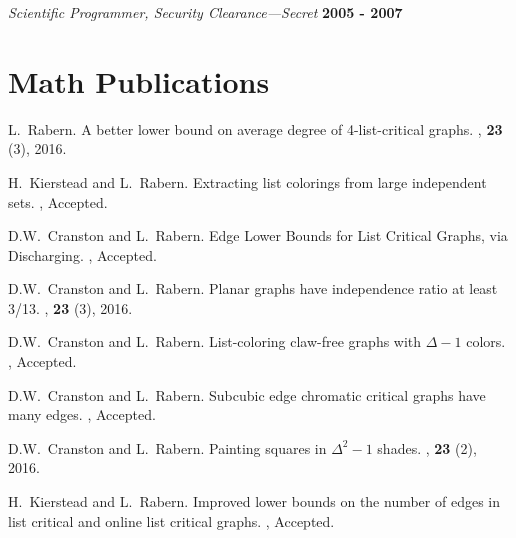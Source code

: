 \documentclass[margin,line]{res}
\begin{document}
\begin{resume}
\vspace{-.4cm}
{\em Scientific Programmer, Security Clearance---Secret} \hfill {\bf 2005 - 2007}

\section{\sc Math Publications}

\begin{enumerate}[{[}1{]}]

\item
L.~Rabern.
\newblock A better lower bound on average degree of 4-list-critical graphs.
, \textbf{23} (3), 2016.
	
	\smallskip
	
	\item
H.~Kierstead and L.~Rabern.
\newblock Extracting list colorings from large independent sets.
, Accepted.

\smallskip

	\item
	D.W.~Cranston and L.~Rabern.
	\newblock Edge Lower Bounds for List Critical Graphs, via Discharging.
	, Accepted.
	\smallskip

\item
D.W.~Cranston and L.~Rabern.
\newblock Planar graphs have independence ratio at least 3/13.
, \textbf{23} (3), 2016.
\smallskip

\item
D.W.~Cranston and L.~Rabern.
\newblock List-coloring claw-free graphs with $\Delta - 1$ colors.
, Accepted.
\smallskip

\item
D.W.~Cranston and L.~Rabern.
\newblock Subcubic edge chromatic critical graphs have many edges.
, Accepted.
\smallskip

\item
D.W.~Cranston and L.~Rabern.
\newblock Painting squares in $\Delta^2 - 1$ shades.
, \textbf{23} (2), 2016.
	
	\smallskip
	
	\item
H.~Kierstead and L.~Rabern.
\newblock Improved lower bounds on the number of edges in list critical and online list critical graphs.
, Accepted.


\end{enumerate}
\end{resume}
\end{document}
